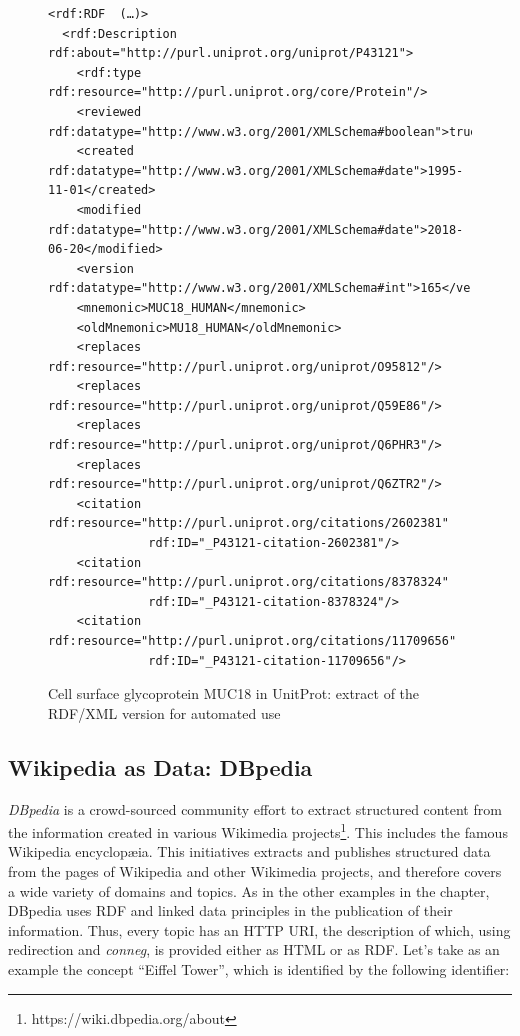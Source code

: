 \begin{figure}
\begin{lstlisting}
<rdf:RDF  (…)>
  <rdf:Description rdf:about="http://purl.uniprot.org/uniprot/P43121">
    <rdf:type rdf:resource="http://purl.uniprot.org/core/Protein"/>
    <reviewed rdf:datatype="http://www.w3.org/2001/XMLSchema#boolean">true</reviewed>
    <created rdf:datatype="http://www.w3.org/2001/XMLSchema#date">1995-11-01</created>
    <modified rdf:datatype="http://www.w3.org/2001/XMLSchema#date">2018-06-20</modified>
    <version rdf:datatype="http://www.w3.org/2001/XMLSchema#int">165</version>
    <mnemonic>MUC18_HUMAN</mnemonic>
    <oldMnemonic>MU18_HUMAN</oldMnemonic>
    <replaces rdf:resource="http://purl.uniprot.org/uniprot/O95812"/>
    <replaces rdf:resource="http://purl.uniprot.org/uniprot/Q59E86"/>
    <replaces rdf:resource="http://purl.uniprot.org/uniprot/Q6PHR3"/>
    <replaces rdf:resource="http://purl.uniprot.org/uniprot/Q6ZTR2"/>
    <citation rdf:resource="http://purl.uniprot.org/citations/2602381" 
              rdf:ID="_P43121-citation-2602381"/>
    <citation rdf:resource="http://purl.uniprot.org/citations/8378324" 
              rdf:ID="_P43121-citation-8378324"/>
    <citation rdf:resource="http://purl.uniprot.org/citations/11709656" 
              rdf:ID="_P43121-citation-11709656"/>
\end{lstlisting}
    \caption{Cell surface glycoprotein MUC18 in UnitProt: extract of the
RDF/XML version for automated use}
    \label{fig:ch5.6}
\end{figure}

\subsection{Wikipedia as Data: DBpedia}
\label{dbpedia}

\emph{DBpedia} is a crowd-sourced community effort to extract structured
content from the information created in various Wikimedia projects\footnote{https://wiki.dbpedia.org/about}. 
This includes the famous Wikipedia encyclop{\ae}ia.  This initiatives extracts
and publishes structured data from the pages of Wikipedia
and other Wikimedia projects, and therefore covers a wide variety of
domains and topics. As in the other examples in the chapter, DBpedia uses RDF and linked data 
principles in the publication of their information. 
Thus, every topic has an HTTP URI, the description of which, using redirection and \emph{conneg},  
is provided  either as
HTML or as 
RDF. Let's take as an example the concept ``Eiffel Tower'', which is identified by the
following identifier:

